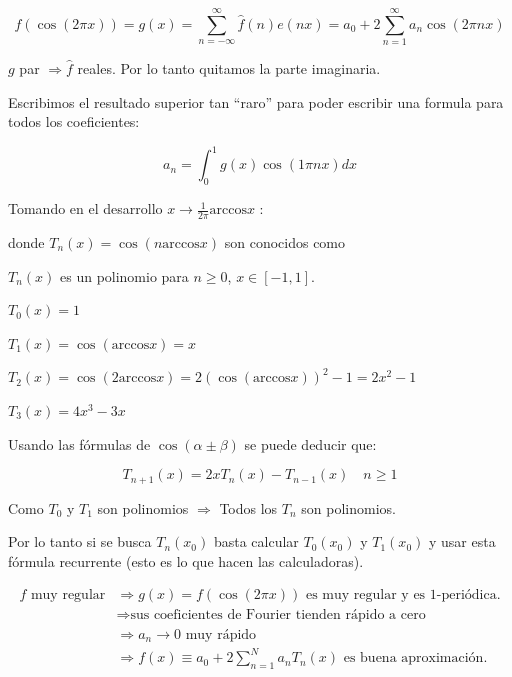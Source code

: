 		$$f(\cos (2 \pi x)) = g(x) = \sum\limits^{\infty}_{n = -\infty} \hat{f}(n) e(nx) = a_0 + 2 \sum\limits^{\infty}_{n=1} a_n \cos(2 \pi nx)$$

		\begin{obs}
			$g$ par $\Rightarrow \hat{f}$ reales. Por lo tanto quitamos la parte imaginaria.
		\end{obs}

		Escribimos el resultado superior tan ``raro'' para poder escribir una formula para todos los coeficientes:

		$$ a_n = \int^{1}_0 g(x) \cos (1 \pi n x) dx $$

		Tomando en el desarrollo $x \to \frac{1}{2 \pi} \text{arccos} x$ :


		donde $T_n (x) = \cos (n \text{arccos} x)$ son conocidos como 
		\begin{obs}
			$T_n (x)$ es un polinomio para $n \geq 0$, $x \in [-1,1]$.
		\end{obs}

		\begin{example}
			$T_0 (x) = 1$

			$T_1 (x) = \cos (\text{arccos} x) = x$

			$T_2 (x) = \cos (2 \text{arccos} x) = 2 (\cos (\text{arccos} x))^2 - 1 = 2x^2 - 1$

			$T_3 (x) = 4x^3 - 3x$
		\end{example}


		Usando las fórmulas de $\cos ( \alpha \pm \beta)$ se puede deducir que:

		$$T_{n+1} (x) = 2 x T_n (x) - T_{n-1} (x) \quad n \geq 1$$

		Como $T_0$ y $T_1$ son polinomios $\Rightarrow$ Todos los $T_n$ son polinomios.

		\begin{obs}
			Por lo tanto si se busca $T_n (x_0)$ basta calcular $T_0 (x_0)$ y $T_1 (x_0)$ y usar esta fórmula recurrente (esto es lo que hacen las calculadoras).
		\end{obs}
		\[
		\begin{aligned}
		f \text{ muy regular} & \Rightarrow g(x) = f(\cos (2 \pi x))\text{ es muy regular y es 1-periódica.} \\
		& \Rightarrow \text{sus coeficientes de Fourier tienden rápido a cero} \\
		& \Rightarrow a_n \rightarrow 0 \text{ muy rápido} \\
		& \Rightarrow f(x) \equiv a_0 + 2 \sum\limits^{N}_{n=1} a_n T_n (x) \text{ es buena aproximación.} \\
		\end{aligned}
		\]


